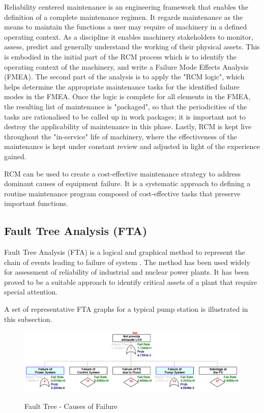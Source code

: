 Reliability centered maintenance is an engineering framework that enables the definition of a complete maintenance regimen. It regards maintenance as the means to maintain the functions a user may require of machinery in a defined operating context. As a discipline it enables machinery stakeholders to monitor, assess, predict and generally understand the working of their physical assets. This is embodied in the initial part of the RCM process which is to identify the operating context of the machinery, and write a Failure Mode Effects Analysis (FMEA). The second part of the analysis is to apply the "RCM logic", which helps determine the appropriate maintenance tasks for the identified failure modes in the FMEA. Once the logic is complete for all elements in the FMEA, the resulting list of maintenance is "packaged", so that the periodicities of the tasks are rationalised to be called up in work packages; it is important not to destroy the applicability of maintenance in this phase. Lastly, RCM is kept live throughout the "in-service" life of machinery, where the effectiveness of the maintenance is kept under constant review and adjusted in light of the experience gained.

RCM can be used to create a cost-effective maintenance strategy to address dominant causes of equipment failure. It is a systematic approach to defining a routine maintenance program composed of cost-effective tasks that preserve important functions.






\subsection{Fault Tree Analysis (FTA)}
Fault Tree Analysis (FTA) is a logical and graphical method to represent the chain of events leading to failure of system \cite{Larsen1974, Pate-Cornell1984}. The method has been used widely for assessment of reliability of industrial and nuclear power plants. It has been proved to be a suitable approach to identify critical assets of a plant that require special attention. 

A set of representative FTA graphs for a typical pump station is illustrated in this subsection.

\begin{figure}[!htb]
	\includegraphics[scale=1.3]{figures/fta01} \\
	\caption{Fault Tree - Causes of Failure}
	\label{fta01} 
\end{figure}

